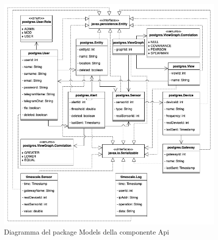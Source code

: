 		\begin{figure}[H]
			\centering
			\includegraphics[scale=0.550]{res/images/API/ModelsPackage.png}
			\caption{Diagramma del package Models della componente Api}
			\label{Diagramma 14}
		\end{figure}
